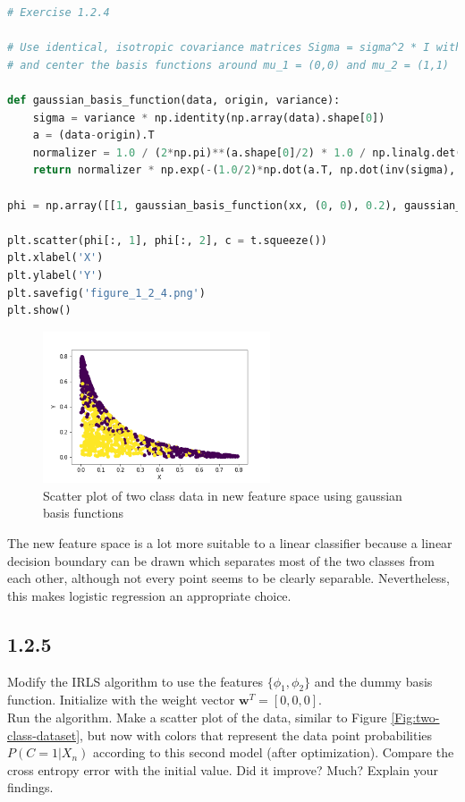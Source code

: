 \documentclass[a4paper]{article}
\begin{document}
\begin{lstlisting}[language=Python]
# Exercise 1.2.4

# Use identical, isotropic covariance matrices Sigma = sigma^2 * I with sigma^2 = 0.2
# and center the basis functions around mu_1 = (0,0) and mu_2 = (1,1)

def gaussian_basis_function(data, origin, variance):
    sigma = variance * np.identity(np.array(data).shape[0])
    a = (data-origin).T
    normalizer = 1.0 / (2*np.pi)**(a.shape[0]/2) * 1.0 / np.linalg.det(sigma)**(1/2)
    return normalizer * np.exp(-(1.0/2)*np.dot(a.T, np.dot(inv(sigma), a)))

phi = np.array([[1, gaussian_basis_function(xx, (0, 0), 0.2), gaussian_basis_function(xx, (1, 1), 0.2)] for xx in x])

plt.scatter(phi[:, 1], phi[:, 2], c = t.squeeze())
plt.xlabel('X')
plt.ylabel('Y')
plt.savefig('figure_1_2_4.png')
plt.show()
\end{lstlisting}


\begin{figure}[H]
\center
\includegraphics[width=0.6\textwidth]{Images/figure_1_2_4.png}
\caption{Scatter plot of two class data in new feature space using gaussian basis functions}
\label{Fig:1_2_4}
\end{figure}

The new feature space is a lot more suitable to a linear classifier because a linear decision boundary can be drawn which separates most of the two classes from each other, although not every point seems to be clearly separable. Nevertheless, this makes logistic regression an appropriate choice.




\subsection*{1.2.5}

Modify the IRLS algorithm to use the features $\{ \phi_1, \phi_2 \}$ and the dummy basis function. Initialize with the weight vector $\textbf{w}^T = [0,0,0]$.\\
Run the algorithm. Make a scatter plot of the data, similar to Figure \ref{Fig:two-class-dataset}, but now with colors that represent the data point probabilities $P(C = 1 | X_n)$ according to this second model (after optimization). Compare the cross entropy error with the initial value. Did it improve? Much? Explain your findings.\\
\end{document}
